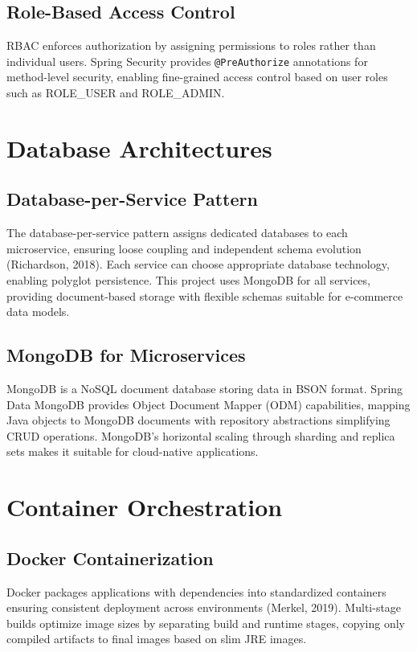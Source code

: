 \subsection{Role-Based Access Control}

RBAC enforces authorization by assigning permissions to roles rather than individual users. Spring Security provides \texttt{@PreAuthorize} annotations for method-level security, enabling fine-grained access control based on user roles such as ROLE\_USER and ROLE\_ADMIN.

\section{Database Architectures}

\subsection{Database-per-Service Pattern}

The database-per-service pattern assigns dedicated databases to each microservice, ensuring loose coupling and independent schema evolution (Richardson, 2018). Each service can choose appropriate database technology, enabling polyglot persistence. This project uses MongoDB for all services, providing document-based storage with flexible schemas suitable for e-commerce data models.

\subsection{MongoDB for Microservices}

MongoDB is a NoSQL document database storing data in BSON format. Spring Data MongoDB provides Object Document Mapper (ODM) capabilities, mapping Java objects to MongoDB documents with repository abstractions simplifying CRUD operations. MongoDB's horizontal scaling through sharding and replica sets makes it suitable for cloud-native applications.

\section{Container Orchestration}

\subsection{Docker Containerization}

Docker packages applications with dependencies into standardized containers ensuring consistent deployment across environments (Merkel, 2019). Multi-stage builds optimize image sizes by separating build and runtime stages, copying only compiled artifacts to final images based on slim JRE images.

